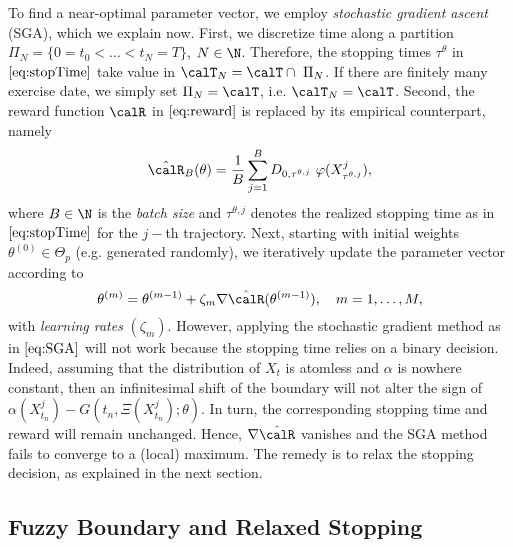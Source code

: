 To find a near-optimal parameter vector, we employ  \textit{stochastic gradient ascent} (SGA), which we explain now. First, we discretize time along a partition $\Pi_N = \{0 = t_0 < \ldots < t_N=T\}$, $N\in \N$. Therefore, the stopping times $\tau^{\theta}$ in $\eqref{eq:stopTime}$ take value in   $\calT_N = \calT \cap \ \Pi_N$. %
If there are finitely many exercise date, we simply set $\Pi_N = \calT$, i.e. $\calT_N = \calT$. 
Second, the reward function $\calR$ in $\eqref{eq:reward}$ is replaced by its empirical counterpart, namely
\begin{equation}\label{eq:empReward1}
    \hat{\calR}_B(\theta) = \frac{1}{B}\sum_{j=1}^B   D_{0,\tau^{\theta,j}}  \ \varphi(X_{\tau^{\theta,j}}^j),
\end{equation}
where $B\in \N$ is the \textit{batch size} and  $\tau^{\theta,j}$ denotes the realized  stopping time as in $\eqref{eq:stopTime}$ for the $j-$th trajectory. Next, 
starting with initial weights  $\theta^{(0)}\in \Theta_p$ (e.g. generated randomly), we iteratively update the parameter vector  according to 
\begin{equation}\label{eq:SGA}
\theta^{(m)} = \theta^{(m-1)} + \zeta_m \nabla \hat{\calR}(\theta^{(m-1)}), \quad m=1,\ldots, M,  
\end{equation}
with \textit{learning rates} $(\zeta_m)$. 
However, applying the stochastic gradient method as in $\eqref{eq:SGA}$ will not work because the stopping time relies on a binary decision.  Indeed, assuming that the distribution of $X_t$ is atomless and $\alpha$ is nowhere constant, then an infinitesimal shift of the boundary will not alter the sign of  $\alpha(X^{j}_{t_n}) - G(t_n,\Xi(X^{j}_{t_n}); \theta)$. In turn, the corresponding stopping time and  reward will remain unchanged. 
Hence, $\nabla \hat{\calR}$ vanishes and the SGA method fails to  converge to a (local) maximum. 
The remedy is to relax the stopping decision, as  explained in the next section. %

\subsection{Fuzzy Boundary and Relaxed Stopping}

